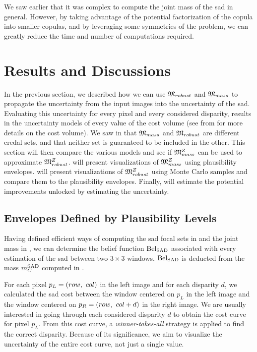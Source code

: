 We saw earlier that it was complex to compute the joint mass of the \acrshort{sad} in general. However, by taking advantage of the potential factorization of the copula into smaller copulas, and by leveraging some symmetries of the problem, we can greatly reduce the time and number of computations required.

\section{Results and Discussions}
In the previous section, we described how we can use $\mathfrak{M}_{robust}$ and $\mathfrak{M}_{mass}$ to propagate the uncertainty from the input images into the uncertainty of the \acrshort{sad}. Evaluating this uncertainty for every pixel and every considered disparity, results in the uncertainty models of every value of the cost volume (see  from  for more details on the cost volume). We saw in  that $\mathfrak{M}_{mass}$ and $\mathfrak{M}_{robust}$ are different credal sets, and that neither set is guaranteed to be included in the other. This section will then compare the various models and see if $\mathfrak{M}^Z_{mass}$ can be used to approximate $\mathfrak{M}^Z_{robust}$.  will present visualizations of  $\mathfrak{M}^Z_{mass}$ using plausibility envelopes.  will present visualizations of $\mathfrak{M}^Z_{robust}$ using Monte Carlo samples and compare them to the plausibility envelopes. Finally,  will estimate the potential improvements unlocked by estimating the uncertainty.

\subsection{Envelopes Defined by Plausibility Levels}\label{sec:envelopes_plausibility}
Having defined efficient ways of computing the \acrshort{sad} focal sets in  and the joint mass in , we can determine the belief function $\mathrm{Bel}_{\mathrm{SAD}}$ associated with every estimation of the \acrshort{sad} between two $3\times3$ windows. $\mathrm{Bel}_{\mathrm{SAD}}$ is deducted from the mass $m^{\mathrm{SAD}}_C$ computed in .

For each pixel $p_L=(row, ~col)$ in the left image and for each disparity $d$, we calculated the \acrshort{sad} cost between the window centered on $p_L$ in the left image and the window centered on $p_R=(row, ~col+d)$ in the right image. We are usually interested in going through each considered disparity $d$ to obtain the cost curve for pixel $p_L$. From this cost curve, a \textit{winner-takes-all} strategy is applied to find the correct disparity. Because of its significance, we aim to visualize the uncertainty of the entire cost curve, not just a single value.

